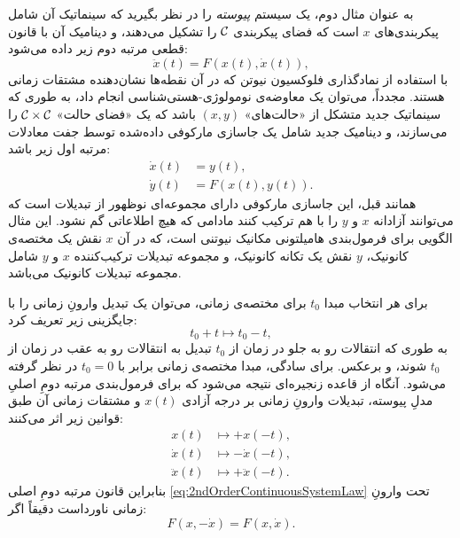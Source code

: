 \documentclass{article}
\begin{document}
به عنوان مثال دوم، یک سیستم \emph{پیوسته} را در نظر بگیرید که سینماتیک آن شامل پیکربندی‌های $x$ است که فضای پیکربندی $\mathcal{C}$ را تشکیل می‌دهند، و دینامیک آن با قانون قطعی مرتبه دوم زیر داده می‌شود:
\begin{equation}
\ddot{x}\left(t\right)=F\left(x\left(t\right),\dot{x}\left(t\right)\right),\label{eq:2ndOrderContinuousSystemLaw}
\end{equation}
 با استفاده از نمادگذاری فلوکسیون نیوتن که در آن نقطه‌ها نشان‌دهنده مشتقات زمانی هستند.
مجدداً، می‌توان یک معاوضه‌ی نومولوژی-هستی‌شناسی انجام داد، به طوری که سینماتیک جدید متشکل از «حالت‌های» $\left(x,y\right)$ باشد که یک «فضای حالت» $\mathcal{C}\times\mathcal{C}$ را می‌سازند، و دینامیک جدید شامل یک جاسازی مارکوفی داده‌شده توسط جفت معادلات مرتبه اول زیر باشد:
\begin{equation}
\begin{aligned}\dot{x}\left(t\right) & =y\left(t\right),\\
\dot{y}\left(t\right) & =F\left(x\left(t\right),y\left(t\right)\right).
\end{aligned}
\label{eq:1stOrderMarkovianEmbeddingContinuous}
\end{equation}
 همانند قبل، این جاسازی مارکوفی دارای مجموعه‌ای نوظهور از تبدیلات است که می‌توانند آزادانه $x$ و $y$ را با هم ترکیب کنند مادامی که هیچ اطلاعاتی گم نشود. این مثال الگویی برای فرمول‌بندی هامیلتونی مکانیک نیوتنی است، که در آن $x$ نقش یک مختصه‌ی کانونیک، $y$ نقش یک تکانه کانونیک، و مجموعه تبدیلات ترکیب‌کننده $x$ و $y$ شامل مجموعه تبدیلات کانونیک می‌باشد.

برای هر انتخاب مبدا $t_{0}$ برای مختصه‌ی زمانی، می‌توان یک تبدیل وارونِ زمانی  را با جایگزینی زیر تعریف کرد:
\begin{equation}
t_{0}+t\mapsto t_{0}-t,\label{eq:TimeReversalTransf}
\end{equation}
 به طوری که انتقالات رو به جلو در زمان از $t_{0}$ تبدیل به انتقالات رو به عقب در زمان از $t_{0}$ شوند، و برعکس. برای سادگی، مبدا مختصه‌ی زمانی برابر با $t_{0}=0$ در نظر گرفته می‌شود. آنگاه از قاعده زنجیره‌ای نتیجه می‌شود که برای فرمول‌بندی مرتبه دومِ اصلیِ مدلِ پیوسته، تبدیلات وارونِ زمانی بر درجه آزادی $x\left(t\right)$ و مشتقات زمانی آن طبق قوانین زیر اثر می‌کنند:
\begin{align}
x\left(t\right) & \mapsto+x\left(-t\right),\nonumber \\
\dot{x}\left(t\right) & \mapsto-\dot{x}\left(-t\right),\label{eq:ContinuousModelTimeReversalDof}\\
\ddot{x}\left(t\right) & \mapsto+\ddot{x}\left(-t\right).\nonumber 
\end{align}
 بنابراین قانون مرتبه دومِ اصلی \eqref{eq:2ndOrderContinuousSystemLaw} تحت وارونِ زمانی ناورداست دقیقاً اگر:
\begin{equation}
F\left(x,-\dot{x}\right)=F\left(x,\dot{x}\right).\label{eq:2ndOrderContinuousTimeReversalInvariantLaw}
\end{equation}
\end{document}
